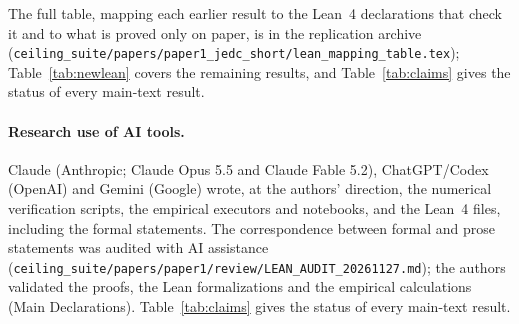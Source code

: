 \documentclass[12pt]{article}
\theoremstyle{definition}
\theoremstyle{remark}
\begin{document}
The full table, mapping each earlier result to the Lean~4 declarations that check it and to what is proved only on paper, is in the replication archive (\nolinkurl{ceiling_suite/papers/paper1_jedc_short/lean_mapping_table.tex}); Table~\ref{tab:newlean} covers the remaining results, and Table~\ref{tab:claims} gives the status of every main-text result.



\paragraph{Research use of AI tools.} Claude (Anthropic; Claude Opus 5.5 and Claude Fable 5.2), ChatGPT/Codex (OpenAI) and Gemini (Google) wrote, at the authors' direction, the numerical verification scripts, the empirical executors and notebooks, and the Lean~4 files, including the formal statements. The correspondence between formal and prose statements was audited with AI assistance (\nolinkurl{ceiling_suite/papers/paper1/review/LEAN_AUDIT_20261127.md}); the authors validated the proofs, the Lean formalizations and the empirical calculations (Main Declarations). Table~\ref{tab:claims} gives the status of every main-text result.
\end{document}
